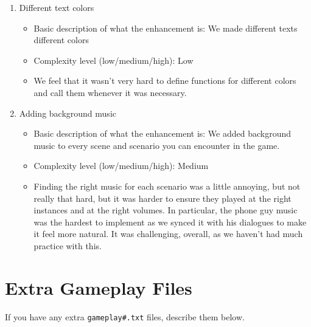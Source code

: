 \documentclass[11pt]{article}
\begin{document}
\begin{enumerate}
\begin{itemize}
	\end{itemize}
\item Different text colors
	\begin{itemize}
	\item Basic description of what the enhancement is: We made different texts different colors
	\item Complexity level (low/medium/high): Low
	\item We feel that it wasn't very hard to define functions for different colors and call them whenever it was necessary.
	\end{itemize}
\item Adding background music
	\begin{itemize}
	\item Basic description of what the enhancement is: We added background music to every scene and scenario you can encounter in the game.
	\item Complexity level (low/medium/high): Medium
	\item Finding the right music for each scenario was a little annoying, but not really that hard, but it was harder to ensure they played at the right instances and at the right volumes. In particular, the phone guy music was the hardest to implement as we synced it with his dialogues to make it feel more natural. It was challenging, overall, as we haven't had much practice with this.
	\end{itemize}
\end{enumerate}


\section*{Extra Gameplay Files}

If you have any extra \texttt{gameplay\#.txt} files, describe them below.
\end{document}
